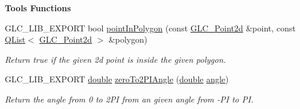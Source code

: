 \begin{Indent}{\bf Tools Functions}
\begin{DoxyCompactItemize}
\item 
G\-L\-C\-\_\-\-L\-I\-B\-\_\-\-E\-X\-P\-O\-R\-T bool \hyperlink{namespaceglc_ad250e523ebf6d885011a2ac60ba0c478}{point\-In\-Polygon} (const \hyperlink{glc__vector2d_8h_aa2ff653e68023d8ac19c421c53fd764a}{G\-L\-C\-\_\-\-Point2d} \&point, const \hyperlink{class_q_list}{Q\-List}$<$ \hyperlink{glc__vector2d_8h_aa2ff653e68023d8ac19c421c53fd764a}{G\-L\-C\-\_\-\-Point2d} $>$ \&polygon)
\begin{DoxyCompactList}\small\item\em Return true if the given 2d point is inside the given polygon. \end{DoxyCompactList}\item 
G\-L\-C\-\_\-\-L\-I\-B\-\_\-\-E\-X\-P\-O\-R\-T \hyperlink{_super_l_u_support_8h_a8956b2b9f49bf918deed98379d159ca7}{double} \hyperlink{namespaceglc_a98543c1d04f4f5e0ac80a8e76692b6f4}{zero\-To2\-P\-I\-Angle} (\hyperlink{_super_l_u_support_8h_a8956b2b9f49bf918deed98379d159ca7}{double} \hyperlink{glext_8h_a9e06c1f76a20fed54ca742cd25cb02c4}{angle})
\begin{DoxyCompactList}\small\item\em Return the angle from 0 to 2\-P\-I from an given angle from -\/\-P\-I to P\-I. \end{DoxyCompactList}\end{DoxyCompactItemize}
\end{Indent}
